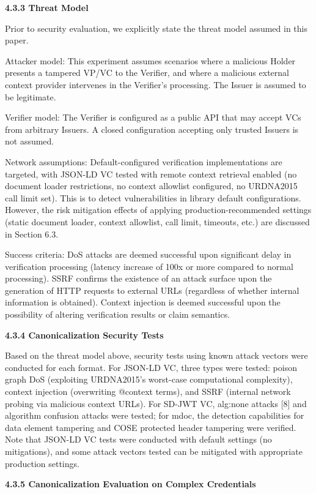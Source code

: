 \textbf{4.3.3 Threat Model}

Prior to security evaluation, we explicitly state the threat model assumed in this paper.

Attacker model: This experiment assumes scenarios where a malicious Holder presents a tampered VP/VC to the Verifier, and where a malicious external context provider intervenes in the Verifier's processing. The Issuer is assumed to be legitimate.

Verifier model: The Verifier is configured as a public API that may accept VCs from arbitrary Issuers. A closed configuration accepting only trusted Issuers is not assumed.

Network assumptions: Default-configured verification implementations are targeted, with JSON-LD VC tested with remote context retrieval enabled (no document loader restrictions, no context allowlist configured, no URDNA2015 call limit set). This is to detect vulnerabilities in library default configurations. However, the risk mitigation effects of applying production-recommended settings (static document loader, context allowlist, call limit, timeouts, etc.) are discussed in Section 6.3.

Success criteria: DoS attacks are deemed successful upon significant delay in verification processing (latency increase of 100x or more compared to normal processing). SSRF confirms the existence of an attack surface upon the generation of HTTP requests to external URLs (regardless of whether internal information is obtained). Context injection is deemed successful upon the possibility of altering verification results or claim semantics.

\textbf{4.3.4 Canonicalization Security Tests}

Based on the threat model above, security tests using known attack vectors were conducted for each format. For JSON-LD VC, three types were tested: poison graph DoS (exploiting URDNA2015's worst-case computational complexity), context injection (overwriting @context terms), and SSRF (internal network probing via malicious context URLs). For SD-JWT VC, alg:none attacks {[}8{]} and algorithm confusion attacks were tested; for mdoc, the detection capabilities for data element tampering and COSE protected header tampering were verified. Note that JSON-LD VC tests were conducted with default settings (no mitigations), and some attack vectors tested can be mitigated with appropriate production settings.

\textbf{4.3.5 Canonicalization Evaluation on Complex Credentials}

